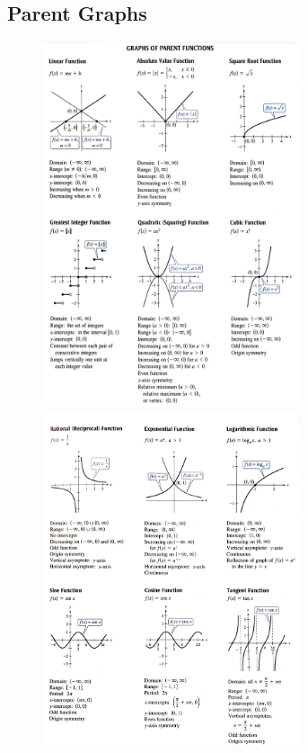 \subsection{Parent Graphs}
\begin{figure}[H]
	\includegraphics[width=7.6cm]{parent1}
	\includegraphics[width=7.6cm]{parent2}
\end{figure}

